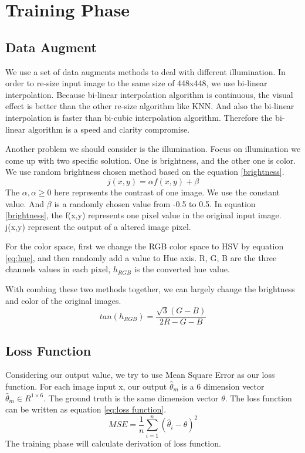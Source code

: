 \documentclass[senior]{IPSstyle}
\begin{document}
\section{Training Phase}
\subsection{Data Augment}
We use a set of data augments methods to deal with different illumination.
In order to re-size input image to the same size of 448x448, we use bi-linear interpolation.
Because bi-linear interpolation algorithm is continuous, the visual effect is better than the other re-size algorithm like KNN\cite{han2013comparison}.
And also the bi-linear interpolation is faster than bi-cubic interpolation algorithm.
Therefore the bi-linear algorithm is a speed and clarity compromise.

Another problem we should consider is the illumination.
Focus on illumination we come up with two specific solution.
One is brightness, and the other one is color.
We use random brightness chosen method based on the equation \ref{brightness}.
\begin{equation}\label{brightness}
    j(x, y) = \alpha f(x, y) + \beta
\end{equation}
The $\alpha, \alpha \geq 0$ here represents the contrast of one image.
We use the constant value.
And $\beta$ is a randomly chosen value from -0.5 to 0.5.
In equation \ref{brightness}, the f(x,y) represents one pixel value in the original input image.
j(x,y) represent the output of a altered image pixel.

For the color space, first we change the RGB color space to HSV by equation \ref{eq:hue}, and then randomly add a value to Hue axis.
R, G, B are the three channels values in each pixel, $h_{RGB}$ is the converted hue value.

With combing these two methods together, we can largely change the brightness and color of the original images. 
\begin{equation}\label{eq:hue}
    tan(h_{RGB}) = \frac{\sqrt{3}(G-B)}{2R-G-B}
\end{equation}

\subsection{Loss Function}
Considering our output value, we try to use Mean Square Error as our loss function.
For each image input x, our output $\hat{\theta}_m$ is a 6 dimension vector $\hat{\theta}_m\in R^{1\times 6}$.
The ground truth is the same dimension vector $\theta$.
The loss function can be written as equation \ref{eq:loss function}.
\begin{equation}\label{eq:loss function}
    MSE=\frac{1}{n}\sum_{i=1}^n (\hat{\theta}_i - \theta)^2
\end{equation}
The training phase will calculate derivation of loss function.
\end{document}
